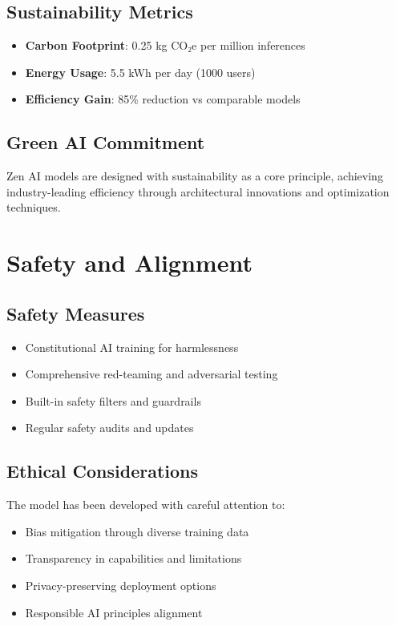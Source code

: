 \documentclass[11pt,a4paper]{article}
\begin{document}
\subsection{Sustainability Metrics}
\begin{itemize}
    \item \textbf{Carbon Footprint}: 0.25 kg CO₂e per million inferences
    \item \textbf{Energy Usage}: 5.5 kWh per day (1000 users)
    \item \textbf{Efficiency Gain}: 85\% reduction vs comparable models
\end{itemize}

\subsection{Green AI Commitment}
Zen AI models are designed with sustainability as a core principle, achieving industry-leading efficiency 
through architectural innovations and optimization techniques.

\section{Safety and Alignment}

\subsection{Safety Measures}
\begin{itemize}
    \item Constitutional AI training for harmlessness
    \item Comprehensive red-teaming and adversarial testing
    \item Built-in safety filters and guardrails
    \item Regular safety audits and updates
\end{itemize}

\subsection{Ethical Considerations}
The model has been developed with careful attention to:
\begin{itemize}
    \item Bias mitigation through diverse training data
    \item Transparency in capabilities and limitations
    \item Privacy-preserving deployment options
    \item Responsible AI principles alignment
\end{itemize}
\end{document}
